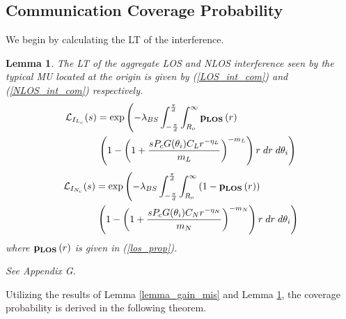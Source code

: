 \documentclass[journal]{IEEEtran}
\newtheorem{lemma}{\textbf{Lemma}}
\begin{document}
 

\subsection{Communication Coverage Probability}


We begin by calculating the LT of the interference.
\begin{lemma} \label{lemma_LT_comm}
The LT of the aggregate LOS and NLOS interference seen by the typical MU located at the origin is given by (\ref{LOS_int_com}) and (\ref{NLOS_int_com}) respectively.
\begin{equation}\label{LOS_int_com}
\begin{aligned}
\mathcal{L}_{I_{L_c}} (s)&=\exp\left(- \lambda_{BS} \int_{-\frac{\pi}{d}}^{\frac{\pi}{d}}\int_{R_o}^{\infty}\bold p_{\bold{LOS}}\left(r\right) \right.\\
&  \left. \left(1-\left( 1+\frac{s P_c G (\theta_i)C_L r^{-\eta_L}}{m_L}\right)^{-m_L}    \right) r\;dr \;d\theta_i \right)
\end{aligned}
\end{equation}
\begin{equation}\label{NLOS_int_com}
\begin{aligned}
\mathcal{L}_{I_{N_c}} (s)&=\exp\left(- \lambda_{BS} \int_{-\frac{\pi}{d}}^{\frac{\pi}{d}}\int_{R_o}^{\infty}\left(1-\bold p_{\bold{LOS}}\left(r\right)\right) \right.\\
& \left. \left(1-\left( 1+\frac{s P_c G (\theta_i)C_N r^{-\eta_N}}{m_N}\right)^{-m_N}    \right) r\;dr \;d\theta_i \right)
\end{aligned}
\end{equation}
where $\bold p_{\bold{LOS}}\left(r\right)$  is given in (\ref{los_prop}).
\begin{IEEEproof}
See Appendix G.
\end{IEEEproof}
\end{lemma}
Utilizing the results of Lemma \ref{lemma_gain_mis} and Lemma \ref{lemma_LT_comm}, the coverage probability is derived in the following theorem.
\end{document}
